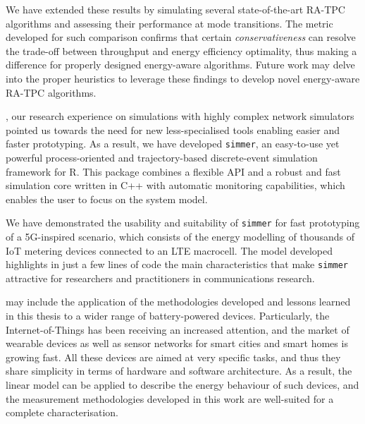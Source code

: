 \documentclass[twoside,nohyper]{tufte-book}
\begin{document}
We have extended\cite[0pt]{contrib-07} these results by simulating several state-of-the-art RA-TPC algorithms and assessing their performance at mode transitions. The metric developed for such comparison confirms that certain \emph{conservativeness} can resolve the trade-off between throughput and energy efficiency optimality, thus making a difference for properly designed energy-aware algorithms. Future work may delve into the proper heuristics to leverage these findings to develop novel energy-aware RA-TPC algorithms.

, our research experience on simulations with highly complex network simulators pointed us towards the need for new less-specialised tools enabling easier and faster prototyping. As a result, we have developed \texttt{simmer}\cite[0pt]{contrib-08a}, an easy-to-use yet powerful process-oriented and trajectory-based discrete-event simulation framework for R. This package combines a flexible API and a robust and fast simulation core written in C++ with automatic monitoring capabilities, which enables the user to focus on the system model.

\pagebreak

We have demonstrated\cite[0pt]{contrib-08b} the usability and suitability of \texttt{simmer} for fast prototyping of a 5G-inspired scenario, which consists of the energy modelling of thousands of IoT metering devices connected to an LTE macrocell. The model developed highlights in just a few lines of code the main characteristics that make \texttt{simmer} attractive for researchers and practitioners in communications research.

 may include the application of the methodologies developed and lessons learned in this thesis to a wider range of battery-powered devices. Particularly, the Internet-of-Things has been receiving an increased attention, and the market of wearable devices as well as sensor networks for smart cities and smart homes is growing fast. All these devices are aimed at very specific tasks, and thus they share simplicity in terms of hardware and software architecture. As a result, the linear model can be applied to describe the energy behaviour of such devices, and the measurement methodologies developed in this work are well-suited for a complete characterisation.
\end{document}
